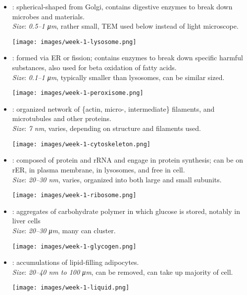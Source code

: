 \begin{multicols}{2}
\begin{itemize}
  \item {}: spherical-shaped from Golgi, contains digestive enzymes to break down microbes and materials.\\
  \textit{Size}: \emph{0.5--1 \si{\micro m}}, rather small, TEM used below instead of light microscope.
  \begin{center}
    \hspace{-30pt}\texttt{[image: images/week-1-lysosome.png]}
  \end{center}
  \item {}: formed via ER or fission; contains enzymes to break down specific harmful substances, also used for beta oxidation of fatty acids. \\
  \textit{Size}: \emph{0.1--1 \si{\micro m}}, typically smaller than lysosomes, can be similar sized.
  \begin{center}
    \hspace{-30pt}\texttt{[image: images/week-1-peroxisome.png]}
  \end{center}
  \item {}: organized network of \{actin, micro-, intermediate\} filaments, and microtubules and other proteins.\\
  \textit{Size}: \emph{7 \si{nm}}, varies, depending on structure and filaments used.
  \begin{center}
    \hspace{-30pt}\texttt{[image: images/week-1-cytoskeleton.png]}
  \end{center}
  \item {}: composed of protein and rRNA and engage in protein synthesis; can be on rER, in plasma membrane, in lysosomes, and free in cell. \\
  \textit{Size}: \emph{20--30 \si{nm}}, varies, organized into both large and small subunits.
  \begin{center}
    \hspace{-30pt}\texttt{[image: images/week-1-ribosome.png]}
  \end{center}
  \item {}: aggregates of carbohydrate polymer in which glucose is stored, notably in liver cells\\
  \textit{Size}: \emph{20--30 \si{\micro m}}, many can cluster.
  \begin{center}
    \hspace{-30pt}\texttt{[image: images/week-1-glycogen.png]}
  \end{center}
  \item {}: accumulations of lipid-filling adipocytes. \\
  \textit{Size}: \emph{20--40 \si{nm} to 100 \si{\micro m}}, can be removed, can take up majority of cell.
  \begin{center}
    \hspace{-30pt}\texttt{[image: images/week-1-liquid.png]}
  \end{center}
  \end{itemize}
\end{multicols}
